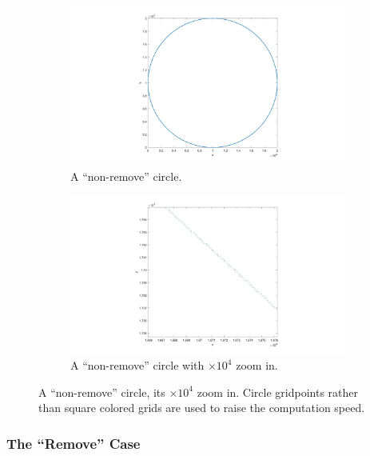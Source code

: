 \documentclass[letterpaper]{article}
\numberwithin{equation}{section} %
\numberwithin{figure}{section} %
\numberwithin{table}{section} %
\begin{document}
\begin{figure}[htbp]
	\centering
	\begin{subfigure}[b]{1\textwidth}
		\includegraphics[width=\textwidth]{NonrmvCircle}
		\caption{A \enquote{non-remove} circle.}
		\label{NonrmvCircle}
	\end{subfigure}
	\begin{subfigure}[b]{1\textwidth}
		\includegraphics[width=\textwidth]{NonrmvCircleZI}
		\caption{A \enquote{non-remove} circle with $\times 10^4$ zoom in.}
		\label{NonrmvCircleZI}
	\end{subfigure}

	\caption{A \enquote{non-remove} circle, its $\times 10^4$ zoom in. Circle gridpoints rather than square colored grids are used to raise the computation speed. }
	\label{circle and zoom in}
\end{figure}


	
\subsubsection{The \enquote{Remove} Case}
\end{document}
